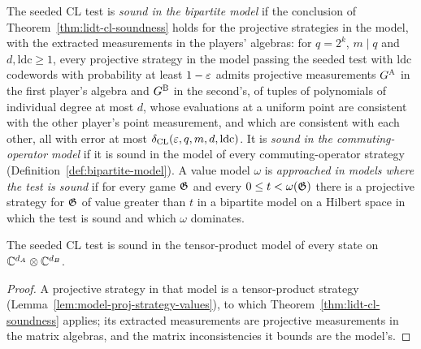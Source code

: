 \begin{definition}
\label{def:lidt-sound-in}
\leanok
The seeded CL test is \emph{sound in the bipartite model} if the conclusion of
Theorem~\ref{thm:lidt-cl-soundness} holds for the projective strategies in the model, with the
extracted measurements in the players' algebras: for $q = 2^k$, $m \mid q$ and $d, \mathrm{ldc}
\geq 1$, every projective strategy in the model passing the seeded test with $\mathrm{ldc}$
codewords with probability at least $1 - \varepsilon$ admits projective measurements $G^{\textsc{A}}$ in the
first player's algebra and $G^{\textsc{B}}$ in the second's, of tuples of polynomials of individual degree
at most $d$, whose evaluations at a uniform point are consistent with the other player's point
measurement, and which are consistent with each other, all with error at most
$\delta_{\mathrm{CL}}(\varepsilon, q, m, d, \mathrm{ldc})$. It is \emph{sound in the commuting-operator
model} if it is sound in the model of every commuting-operator strategy
(Definition~\ref{def:bipartite-model}). A value model $\omega$ is \emph{approached in models where
the test is sound} if for every game $\mathfrak{G}$ and every $0 \leq t < \omega(\mathfrak{G})$ there is a
projective strategy for $\mathfrak{G}$ of value greater than $t$ in a bipartite model on a Hilbert space in
which the test is sound and which $\omega$ dominates.
\end{definition}

\begin{lemma}
\label{lem:lidt-sound-in-tensor}
\leanok
The seeded CL test is sound in the tensor-product model of every state on
$\mathbb{C}^{d_A} \otimes \mathbb{C}^{d_B}$.
\end{lemma}

\begin{proof}
\leanok
A projective strategy in that model is a tensor-product strategy
(Lemma~\ref{lem:model-proj-strategy-values}), to which Theorem~\ref{thm:lidt-cl-soundness}
applies; its extracted measurements are projective measurements in the matrix algebras, and the
matrix inconsistencies it bounds are the model's.
\end{proof}

